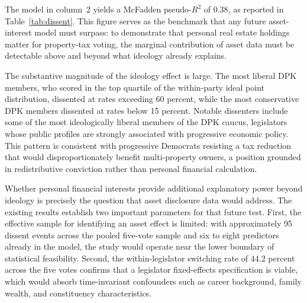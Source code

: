 \documentclass[11pt]{article}
\begin{document}
The model in column~2 yields a McFadden pseudo-$R^2$ of 0.38, as reported in Table~\ref{tab:dissent}. This figure serves as the benchmark that any future asset-interest model must surpass: to demonstrate that personal real estate holdings matter for property-tax voting, the marginal contribution of asset data must be detectable above and beyond what ideology already explains.

The substantive magnitude of the ideology effect is large. The most liberal DPK members, who scored in the top quartile of the within-party ideal point distribution, dissented at rates exceeding 60 percent, while the most conservative DPK members dissented at rates below 15 percent. Notable dissenters include some of the most ideologically liberal members of the DPK caucus, legislators whose public profiles are strongly associated with progressive economic policy. This pattern is consistent with progressive Democrats resisting a tax reduction that would disproportionately benefit multi-property owners, a position grounded in redistributive conviction rather than personal financial calculation.

Whether personal financial interests provide additional explanatory power beyond ideology is precisely the question that asset disclosure data would address. The existing results establish two important parameters for that future test. First, the effective sample for identifying an asset effect is limited: with approximately 95 dissent events across the pooled five-vote sample and six to eight predictors already in the model, the study would operate near the lower boundary of statistical feasibility. Second, the within-legislator switching rate of 44.2 percent across the five votes confirms that a legislator fixed-effects specification is viable, which would absorb time-invariant confounders such as career background, family wealth, and constituency characteristics.
\end{document}

